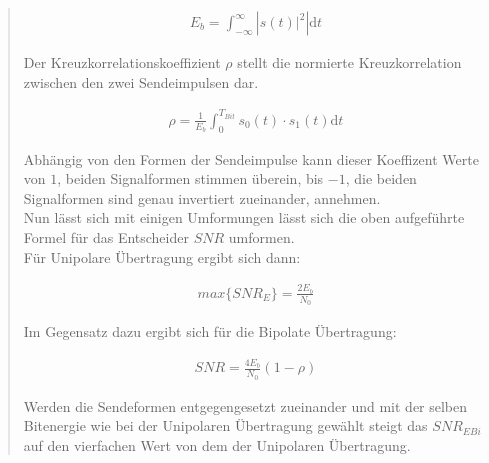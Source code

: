 \begin{quote}
    \begin{equation*}
    	\begin{split}
    		E_b = \int_{-\infty}^{\infty} \left | s(t)|^2 \right | \mathrm dt
    	\end{split}
        
    \end{equation*}
    
    
    Der Kreuzkorrelationskoeffizient $\rho$ stellt die normierte Kreuzkorrelation zwischen den zwei Sendeimpulsen dar.\cite{kreuz}
    
    \begin{equation*}
    	\begin{split}
    		\rho = \frac{1}{E_b} \int_{0}^{T_{Bit}} s_0(t) \cdot s_1(t) \mathrm dt
    	\end{split}
    \end{equation*}
    
    Abhängig von den Formen der Sendeimpulse kann dieser Koeffizent Werte von $1$, beiden Signalformen stimmen überein,
    bis $-1$, die beiden Signalformen sind genau invertiert zueinander, annehmen.\\
        
    Nun lässt sich mit einigen Umformungen lässt sich die oben aufgeführte Formel für das Entscheider $SNR$ umformen.\\
    Für Unipolare Übertragung ergibt sich dann:
    
    \begin{equation*}
    	\begin{split}
    		max\{SNR_E\} = \frac{2 E_b}{N_0}
    	\end{split}
    \end{equation*}
    
    Im Gegensatz dazu ergibt sich für die Bipolate Übertragung:
    
    \begin{equation*}
    	\begin{split}
    		SNR = \frac{4 E_b}{N_0} (1-\rho)
    	\end{split}
    \end{equation*}
    
    Werden die Sendeformen entgegengesetzt zueinander und mit der selben Bitenergie wie bei der Unipolaren
    Übertragung gewählt steigt das $SNR_{E Bi}$ auf den vierfachen Wert von dem der Unipolaren Übertragung.\\
    
    
	
\end{quote}%


